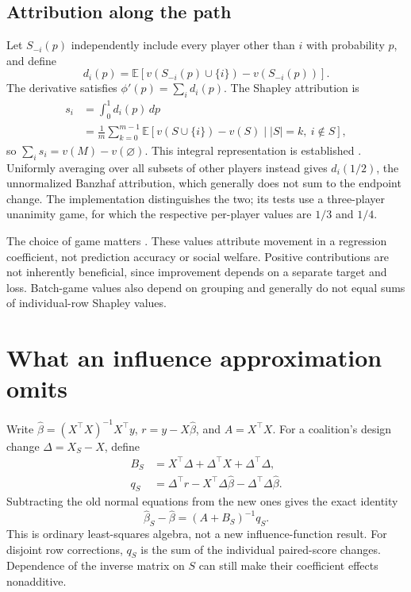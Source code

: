 \documentclass[11pt]{article}
\newcommand{\E}{\mathbb{E}}
\begin{document}
\subsection{Attribution along the path}

Let $S_{-i}(p)$ independently include every player other than $i$ with probability
$p$, and define
\begin{equation}
 d_i(p)=\E[v(S_{-i}(p)\cup\{i\})-v(S_{-i}(p))].
\end{equation}
The derivative satisfies $\phi'(p)=\sum_i d_i(p)$. The Shapley attribution is
\begin{align}
 s_i&=\int_0^1 d_i(p)\,dp\\
 &=\frac1m\sum_{k=0}^{m-1}
 \E[v(S\cup\{i\})-v(S)\mid |S|=k,\ i\notin S],
 \label{eq:shapley}
\end{align}
so $\sum_i s_i=v(M)-v(\varnothing)$. This integral representation is established
\citep{owen1972,okhrati2021}. Uniformly averaging over all subsets of other
players instead gives $d_i(1/2)$, the unnormalized Banzhaf attribution, which
generally does not sum to the endpoint change. The implementation distinguishes
the two; its tests use a three-player unanimity game, for which the respective
per-player values are $1/3$ and $1/4$.

The choice of game matters \citep{sundararajan2020}. These values attribute
movement in a regression coefficient, not prediction accuracy or social welfare.
Positive contributions are not inherently beneficial, since improvement depends
on a separate target and loss. Batch-game values also depend on grouping and
generally do not equal sums of individual-row Shapley values.

\section{What an influence approximation omits}

Write $\widehat\beta=(X^\top X)^{-1}X^\top y$, $r=y-X\widehat\beta$, and
$A=X^\top X$. For a coalition's design change $\Delta=X_S-X$, define
\begin{align}
 B_S&=X^\top\Delta+\Delta^\top X+\Delta^\top\Delta,\\
 q_S&=\Delta^\top r-X^\top\Delta\widehat\beta
                   -\Delta^\top\Delta\widehat\beta.
\end{align}
Subtracting the old normal equations from the new ones gives the exact identity
\begin{equation}
 \widehat\beta_S-\widehat\beta=(A+B_S)^{-1}q_S.
 \label{eq:update}
\end{equation}
This is ordinary least-squares algebra, not a new influence-function result.
For disjoint row corrections, $q_S$ is the sum of the individual paired-score
changes. Dependence of the inverse matrix on $S$ can still make their coefficient
effects nonadditive.
\end{document}
